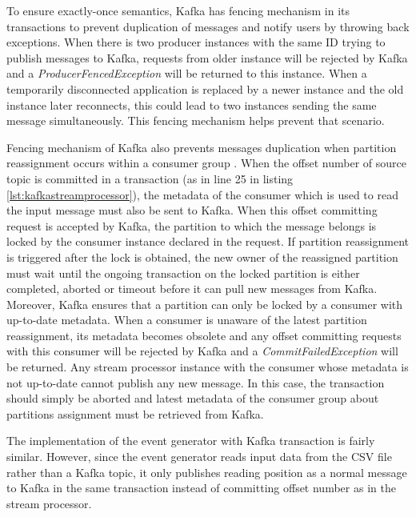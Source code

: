 

To ensure exactly-once semantics, Kafka has fencing mechanism in its transactions to prevent duplication of messages and notify users by throwing back exceptions. When there is two producer instances with the same ID trying to publish messages to Kafka, requests from older instance will be rejected by Kafka and a \emph{ProducerFencedException} will be returned to this instance. When a temporarily disconnected application is replaced by a newer instance and the old instance later reconnects, this could lead to two instances sending the same message simultaneously. This fencing mechanism helps prevent that scenario. 

Fencing mechanism of Kafka also prevents messages duplication when partition reassignment occurs within a consumer group \cite{kafkatransctionscaleproducer}. When the offset number of source topic is committed in a transaction (as in line 25 in listing \ref{lst:kafkastreamprocessor}), the metadata of the consumer which is used to read the input message must also be sent to Kafka. When this offset committing request is accepted by Kafka, the partition to which the message belongs is locked by the consumer instance declared in the request. If partition reassignment is triggered after the lock is obtained, the new owner of the reassigned partition must wait until the ongoing transaction on the locked partition is either completed, aborted or timeout before it can pull new messages from Kafka. Moreover, Kafka ensures that a partition can only be locked by a consumer with up-to-date metadata. When a consumer is unaware of the latest partition reassignment, its metadata becomes obsolete and any offset committing requests with this consumer will be rejected by Kafka and a \emph{CommitFailedException} will be returned. Any stream processor instance with the consumer whose metadata is not up-to-date cannot publish any new message. In this case, the transaction should simply be aborted and latest metadata of the consumer group about partitions assignment must be retrieved from Kafka.

The implementation of the event generator with Kafka transaction is fairly similar. However, since the event generator reads input data from the CSV file rather than a Kafka topic, it only publishes reading position as a normal message to Kafka in the same transaction instead of committing offset number as in the stream processor.

